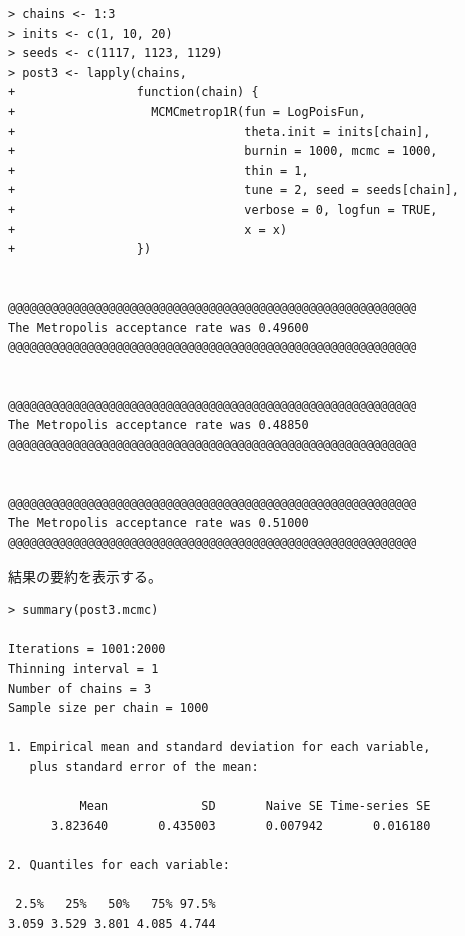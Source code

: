\documentclass[11pt,uplatex]{jsarticle}
\begin{document}
\vspace{1zw}
\begin{lstlisting}
> chains <- 1:3
> inits <- c(1, 10, 20)
> seeds <- c(1117, 1123, 1129)
> post3 <- lapply(chains,
+                 function(chain) {
+                   MCMCmetrop1R(fun = LogPoisFun,
+                                theta.init = inits[chain],
+                                burnin = 1000, mcmc = 1000,
+                                thin = 1,
+                                tune = 2, seed = seeds[chain],
+                                verbose = 0, logfun = TRUE,
+                                x = x)
+                 })


@@@@@@@@@@@@@@@@@@@@@@@@@@@@@@@@@@@@@@@@@@@@@@@@@@@@@@@@@
The Metropolis acceptance rate was 0.49600
@@@@@@@@@@@@@@@@@@@@@@@@@@@@@@@@@@@@@@@@@@@@@@@@@@@@@@@@@


@@@@@@@@@@@@@@@@@@@@@@@@@@@@@@@@@@@@@@@@@@@@@@@@@@@@@@@@@
The Metropolis acceptance rate was 0.48850
@@@@@@@@@@@@@@@@@@@@@@@@@@@@@@@@@@@@@@@@@@@@@@@@@@@@@@@@@


@@@@@@@@@@@@@@@@@@@@@@@@@@@@@@@@@@@@@@@@@@@@@@@@@@@@@@@@@
The Metropolis acceptance rate was 0.51000
@@@@@@@@@@@@@@@@@@@@@@@@@@@@@@@@@@@@@@@@@@@@@@@@@@@@@@@@@
\end{lstlisting}

\vspace{1zw}

結果の要約を表示する。
\begin{lstlisting}
> summary(post3.mcmc)

Iterations = 1001:2000
Thinning interval = 1 
Number of chains = 3 
Sample size per chain = 1000 

1. Empirical mean and standard deviation for each variable,
   plus standard error of the mean:

          Mean             SD       Naive SE Time-series SE 
      3.823640       0.435003       0.007942       0.016180 

2. Quantiles for each variable:

 2.5%   25%   50%   75% 97.5% 
3.059 3.529 3.801 4.085 4.744 

\end{lstlisting}

\vspace{1zw}
\end{document}
